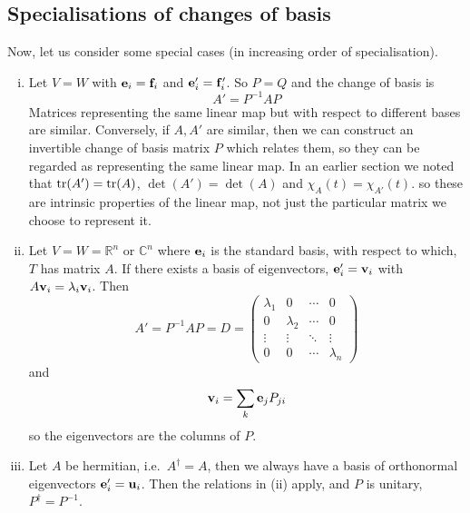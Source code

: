 \subsection{Specialisations of changes of basis}
Now, let us consider some special cases (in increasing order of specialisation).
\begin{enumerate}[(i)]
	\item Let \(V=W\) with \(\vb e_i = \vb f_i\) and \(\vb e'_i = \vb f'_i\).
	      So \(P=Q\) and the change of basis is
	      \[
		      A' = P^{-1}AP
	      \]
	      Matrices representing the same linear map but with respect to different bases are similar.
	      Conversely, if \(A, A'\) are similar, then we can construct an invertible change of basis matrix \(P\) which relates them, so they can be regarded as representing the same linear map.
	      In an earlier section we noted that \(\tr(A') = \tr(A)\), \(\det(A') = \det(A)\) and \(\chi_A(t) = \chi_{A'}(t)\).
	      so these are intrinsic properties of the linear map, not just the particular matrix we choose to represent it.
	\item Let \(V=W=\mathbb R^n\) or \(\mathbb C^n\) where \(\vb e_i\) is the standard basis, with respect to which, \(T\) has matrix \(A\).
	      If there exists a basis of eigenvectors, \(\vb e'_i = \vb v_i\) with \(A\vb v_i = \lambda_i\vb v_i\).
	      Then
	      \[
		      A' = P^{-1}AP = D = \begin{pmatrix}
			      \lambda_1 & 0         & \cdots & 0         \\
			      0         & \lambda_2 & \cdots & 0         \\
			      \vdots    & \vdots    & \ddots & \vdots    \\
			      0         & 0         & \cdots & \lambda_n
		      \end{pmatrix}
	      \]
	      and
	      \[
		      \vb v_i = \sum_k \vb e_j P_{ji}
	      \]
	      so the eigenvectors are the columns of \(P\).
	\item Let \(A\) be hermitian, i.e.\ \(A^\dagger = A\), then we always have a basis of orthonormal eigenvectors \(\vb e'_i = \vb u_i\).
	      Then the relations in (ii) apply, and \(P\) is unitary, \(P^\dagger = P^{-1}\).
\end{enumerate}

